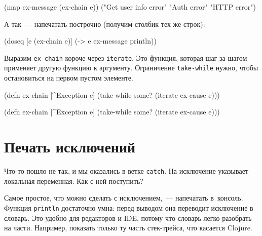 \else

\begin{english}
  \begin{clojure}
(map ex-message (ex-chain e))
("Get user info error" "Auth error" "HTTP error")
  \end{clojure}
\end{english}

\fi

\noindent
А так~--- напечатать построчно (получим столбик тех же строк):


\begin{english}
  \begin{clojure}
(doseq [e (ex-chain e)]
  (-> e ex-message println))
  \end{clojure}
\end{english}

Выразим \verb|ex-chain| короче через \verb|iterate|. Это функция, которая
шаг за шагом применяет другую функцию к аргументу. Ограничение
\verb|take-while| нужно, чтобы остановиться на первом пустом элементе.

\ifx\devicetype\mobile

\begin{english}
  \begin{clojure}
(defn ex-chain [^Exception e]
  (take-while some?
    (iterate ex-cause e)))
  \end{clojure}
\end{english}

\else

\begin{english}
  \begin{clojure}
(defn ex-chain [^Exception e]
  (take-while some? (iterate ex-cause e)))
  \end{clojure}
\end{english}

\fi

\section{Печать исключений}

Что-то пошло не так, и мы оказались в ветке \verb|catch|. На исключение
указывает локальная переменная. Как с ней поступить?

Самое простое, что можно сделать с исключением,~--- напечатать в~консоль. Функция
\verb|println| достаточно умна: перед выводом она переводит исключение в
словарь. Это удобно для редакторов и IDE, потому что словарь легко разобрать на
части. Например, показать только ту часть стек-трейса, что касается Clojure.

